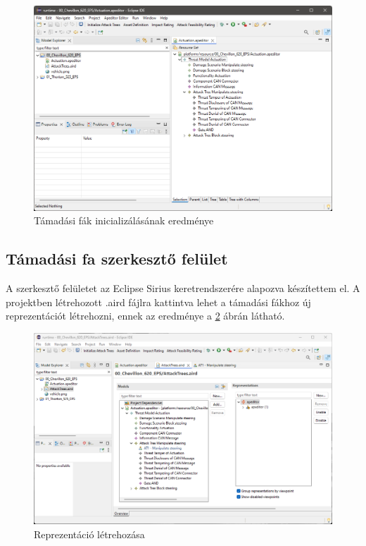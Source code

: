 \begin{figure}[!ht]
	\centering
	\includegraphics[width=130mm, keepaspectratio]{figures/05_at_inited.png}
	\caption{Támadási fák inicializálásának eredménye}
	\label{fig:05_at_inited}
\end{figure}

\subsection{Támadási fa szerkesztő felület}

A szerkesztő felületet az Eclipse Sirius keretrendszerére alapozva készítettem el. A projektben létrehozott .aird fájlra kattintva lehet a támadási fákhoz új reprezentációt létrehozni, ennek az eredménye a \ref{fig:05_at_editor_1} ábrán látható.

\begin{figure}[!ht]
	\centering
	\includegraphics[width=130mm, keepaspectratio]{figures/05_ateditor_1.png}
	\caption{Reprezentáció létrehozása}
	\label{fig:05_at_editor_1}
\end{figure}

